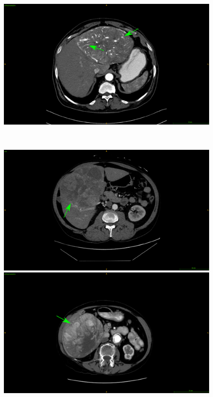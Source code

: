 {\begin{figure}[!ht]
\begin{mdframed}[backgroundcolor=blue!50,linecolor=blue!50]
\begin{minipage}{0.45\linewidth}
		\end{minipage} \hspace{-0.1cm}
		\begin{minipage}{0.45\linewidth}
			\includegraphics[width=\linewidth]{images/ImagingTraits/TCIA_internalArteries}
		\end{minipage} \\
		\begin{minipage}{0.45\linewidth}
			\includegraphics[width=\linewidth]{images/ImagingTraits/GDB_texturalHeterogeneity}
		\end{minipage} \hspace{-0.1cm}
		\begin{minipage}{0.45\linewidth}
			\includegraphics[width=\linewidth]{images/ImagingTraits/TCIA_texturalHeterogeneity}

\end{minipage}
\end{mdframed}
\end{figure}}
